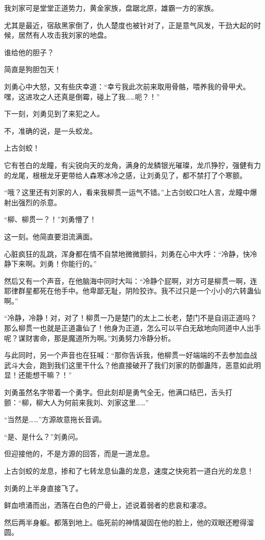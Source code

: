 \begin{this_body}
我刘家可是堂堂正道势力，黄金家族，盘踞北原，雄霸一方的家族。

尤其是最近，宿敌黑家倒了，仇人楚度也被针对了，正是意气风发，干劲大起的时候，居然有人攻击我刘家的地盘。

谁给他的胆子？

简直是狗胆包天！

刘勇心中大怒，又有些庆幸道：“幸亏我此次前来取用骨骼，喂养我的骨甲犬。嘿，这进攻之人还真是倒霉，碰上了我……呃？！”

下一刻，刘勇见到了来犯之人。

不，准确的说，是一头蛟龙。

上古剑蛟！

它有苍白的龙瞳，有尖锐向天的龙角，满身的龙鳞银光璀璨，龙爪狰狞，强健有力的龙尾，根根龙牙更带给人森寒冰冷之感，让刘勇见了，都不禁打了个寒颤。

“哦？这里还有刘家的人，看来我柳贯一运气不错。”上古剑蛟口吐人言，龙瞳中爆射出强烈的杀意。

“柳、柳贯一？！”刘勇懵了！

这一刻。他简直要泪流满面。

心脏疯狂的乱跳，浑身都在情不自禁地微微颤抖，刘勇在心中大呼：“冷静，快冷静下来啊。刘勇！你能行的。”

然后又有一个声音，在他脑海中同时大叫：“冷静个屁啊，对方可是柳贯一啊，连耶律群星都死在他手中。他卑鄙无耻，阴险狡诈。我不过只是一个小小的六转蛊仙啊。”

“冷静，冷静！对，对了！柳贯一乃是楚门的太上二长老，楚门不是自诩正道吗？那么柳贯一也就是正道蛊仙了！他身为正道，怎么可以平白无敌地向同道中人出手呢？谋财害命，那是魔道所为啊。”刘勇努力冷静分析。

与此同时，另一个声音也在狂喊：“那你告诉我，他柳贯一好端端的不去参加血战武斗大会，跑到我们这里干什么？他直接破开了我们刘家的防御蛊阵，恶意如此明显！还能想干嘛？！”

刘勇虽然名字带着一个勇字。但此刻却是勇气全无，他满口结巴，舌头打颤：“柳，柳大人为何前来我刘、刘家这里……”

“当然是……”方源故意拖长音调。

“是、是什么？”刘勇问。

但迎接他的，不是方源的回答，而是一道龙息。

上古剑蛟的龙息，掺和了七转龙息仙蛊的龙息，速度之快宛若一道白光的龙息！

刘勇的上半身直接飞了。

鲜血喷涌而出，洒落在白色的尸骨上，述说着弱者的悲哀和凄凉。

然后两半身躯。都落到地上。临死前的神情凝固在他的脸上，他的双眼还瞪得溜圆。


\end{this_body}

